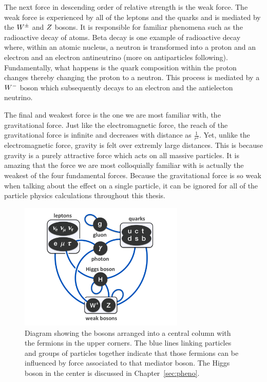 The next force in descending order of relative strength is the weak force.
The weak force is experienced by
all of the leptons and the quarks and is mediated by the $W^{\pm}$ and $Z$ 
bosons. It is responsible for familiar phenomena such as the radioactive decay of atoms. 
Beta decay is one example of radioactive decay where, within an atomic nucleus,
a neutron is transformed into a proton and an electron and an electron antineutrino
(more on antiparticles following). Fundamentally, what happens
is the quark composition within the proton changes thereby changing the proton to a
neutron. This process is mediated by a $W^{-}$ boson which subsequently decays
to an electron and the antielecton neutrino.

The final and weakest force is the one we are most familiar with, the gravitational
force. Just like the electromagnetic force, the reach of the gravitational force 
is infinite and decreases with distance as $\frac{1}{r^{2}}$. Yet, unlike the
electromagnetic force, gravity is felt over extremly large distances. This is because
gravity is a purely attractive force which acts on all massive particles.
It is amazing that the force we are most colloquially familiar with is actually the
weakest of the four fundamental forces. Because the gravitational force is so weak
when talking about the effect on a single particle, it can be ignored for
all of the particle physics calculations throughout this thesis.

\begin{figure}[htbp]
\centering
     \includegraphics[width=0.7\textwidth]{introduction/plots/elementary_particle_interactions_SM.pdf}
     \caption{
Diagram showing the bosons arranged into a central column with the fermions in the
upper corners. The blue lines linking particles and groups of particles together
indicate that those fermions can be influenced by force associated to that mediator
boson. The Higgs boson in the center is discussed in Chapter~\ref{sec:pheno}.
     }
     \label{fig:sm_forces}
\end{figure}

